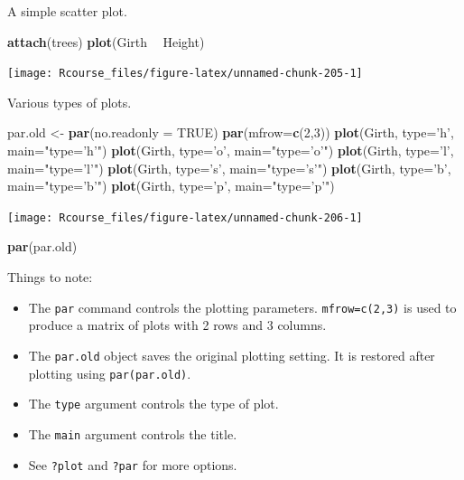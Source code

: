 \documentclass[]{book}
\newenvironment{Shaded}{\begin{snugshade}}{\end{snugshade}}
\newcommand{\KeywordTok}[1]{\textcolor[rgb]{0.13,0.29,0.53}{\textbf{#1}}}
\newcommand{\DataTypeTok}[1]{\textcolor[rgb]{0.13,0.29,0.53}{#1}}
\newcommand{\DecValTok}[1]{\textcolor[rgb]{0.00,0.00,0.81}{#1}}
\newcommand{\StringTok}[1]{\textcolor[rgb]{0.31,0.60,0.02}{#1}}
\newcommand{\OtherTok}[1]{\textcolor[rgb]{0.56,0.35,0.01}{#1}}
\newcommand{\OperatorTok}[1]{\textcolor[rgb]{0.81,0.36,0.00}{\textbf{#1}}}
\newcommand{\NormalTok}[1]{#1}
\providecommand{\tightlist}{%
  \setlength{\itemsep}{0pt}\setlength{\parskip}{0pt}}
\theoremstyle{definition}
\theoremstyle{definition}
\theoremstyle{definition}
\theoremstyle{remark}
\begin{document}
A simple scatter plot.

\begin{Shaded}
\begin{Highlighting}[]
\KeywordTok{attach}\NormalTok{(trees)}
\KeywordTok{plot}\NormalTok{(Girth }\OperatorTok{~}\StringTok{ }\NormalTok{Height)}
\end{Highlighting}
\end{Shaded}

\texttt{[image: Rcourse\_files/figure-latex/unnamed-chunk-205-1]}

Various types of plots.

\begin{Shaded}
\begin{Highlighting}[]
\NormalTok{par.old <-}\StringTok{ }\KeywordTok{par}\NormalTok{(}\DataTypeTok{no.readonly =} \OtherTok{TRUE}\NormalTok{)}
\KeywordTok{par}\NormalTok{(}\DataTypeTok{mfrow=}\KeywordTok{c}\NormalTok{(}\DecValTok{2}\NormalTok{,}\DecValTok{3}\NormalTok{))}
\KeywordTok{plot}\NormalTok{(Girth, }\DataTypeTok{type=}\StringTok{'h'}\NormalTok{, }\DataTypeTok{main=}\StringTok{"type='h'"}\NormalTok{) }
\KeywordTok{plot}\NormalTok{(Girth, }\DataTypeTok{type=}\StringTok{'o'}\NormalTok{, }\DataTypeTok{main=}\StringTok{"type='o'"}\NormalTok{) }
\KeywordTok{plot}\NormalTok{(Girth, }\DataTypeTok{type=}\StringTok{'l'}\NormalTok{, }\DataTypeTok{main=}\StringTok{"type='l'"}\NormalTok{)}
\KeywordTok{plot}\NormalTok{(Girth, }\DataTypeTok{type=}\StringTok{'s'}\NormalTok{, }\DataTypeTok{main=}\StringTok{"type='s'"}\NormalTok{)}
\KeywordTok{plot}\NormalTok{(Girth, }\DataTypeTok{type=}\StringTok{'b'}\NormalTok{, }\DataTypeTok{main=}\StringTok{"type='b'"}\NormalTok{)}
\KeywordTok{plot}\NormalTok{(Girth, }\DataTypeTok{type=}\StringTok{'p'}\NormalTok{, }\DataTypeTok{main=}\StringTok{"type='p'"}\NormalTok{)}
\end{Highlighting}
\end{Shaded}

\texttt{[image: Rcourse\_files/figure-latex/unnamed-chunk-206-1]}

\begin{Shaded}
\begin{Highlighting}[]
\KeywordTok{par}\NormalTok{(par.old)}
\end{Highlighting}
\end{Shaded}

Things to note:

\begin{itemize}
\tightlist
\item
  The \texttt{par} command controls the plotting parameters.
  \texttt{mfrow=c(2,3)} is used to produce a matrix of plots with 2 rows
  and 3 columns.
\item
  The \texttt{par.old} object saves the original plotting setting. It is
  restored after plotting using \texttt{par(par.old)}.
\item
  The \texttt{type} argument controls the type of plot.
\item
  The \texttt{main} argument controls the title.
\item
  See \texttt{?plot} and \texttt{?par} for more options.
\end{itemize}
\end{document}
